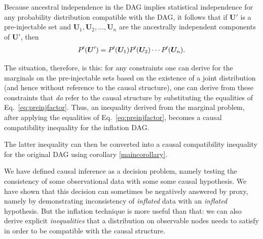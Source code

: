 Because ancestral independence in the DAG implies statistical independence for any probability distribution compatible with the DAG, it follows that  if 
$\bm{U}'$ is a pre-injectable set and $\bm{U}_1,\bm{U}_2,\ldots,\bm{U}_n$ are the ancestrally independent components of $\bm{U}'$, then 
\begin{align}\label{eq:preinjfactor}
{P_{}}^{\prime}\lparen\bm{U}'\rparen = {P_{}}^{\prime}\lparen\bm{U}_1\rparen {P_{}}^{\prime}\lparen\bm{U}_2\rparen  \cdots {P_{}}^{\prime}\lparen\bm{U}_n\rparen.
\end{align}

The situation, therefore, is this: for any constraints one can derive for the marginals on the pre-injectable sets based on the existence of a joint distribution (and hence without reference to the causal structure), one can derive from these constraints that {\em do} refer to the causal structure by substituting the equalities of Eq.~\eqref{eq:preinjfactor}.  Thus, an inequality derived from the marginal problem, after applying the equalities of Eq.~\eqref{eq:preinjfactor}, becomes a causal compatibility inequality for the inflation DAG. 

The latter inequality can then be converted into a causal compatibility inequality for the original DAG using corollary \ref{maincorollary}.

\color{black}


We have defined causal inference as a decision problem, namely testing the consistency of some observational data with some some causal hypothesis. We have shown that this decision can sometimes be negatively answered by proxy, namely by demonstrating inconsistency of \emph{inflated} data with an \emph{inflated} hypothesis. But the inflation technique is more useful than that: we can also derive explicit \emph{inequalities} that a distribution on observable nodes needs to satisfy in order to be compatible with the causal structure. %

